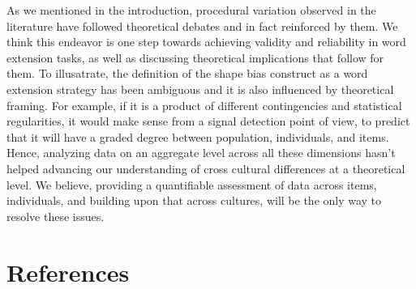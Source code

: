 \documentclass[10pt, letterpaper]{article}
\begin{document}
As we mentioned in the introduction, procedural variation observed in
the literature have followed theoretical debates and in fact reinforced
by them. We think this endeavor is one step towards achieving validity
and reliability in word extension tasks, as well as discussing
theoretical implications that follow for them. To illusatrate, the
definition of the shape bias construct as a word extension strategy has
been ambiguous and it is also influenced by theoretical framing. For
example, if it is a product of different contingencies and statistical
regularities, it would make sense from a signal detection point of view,
to predict that it will have a graded degree between population,
individuals, and items. Hence, analyzing data on an aggregate level
across all these dimensions hasn't helped advancing our understanding of
cross cultural differences at a theoretical level. We believe, providing
a quantifiable assessment of data across items, individuals, and
building upon that across cultures, will be the only way to resolve
these issues.

\section{References}\label{references}

\setlength{\parindent}{-0.1in} 
\setlength{\leftskip}{0.125in}

\noindent
\end{document}
